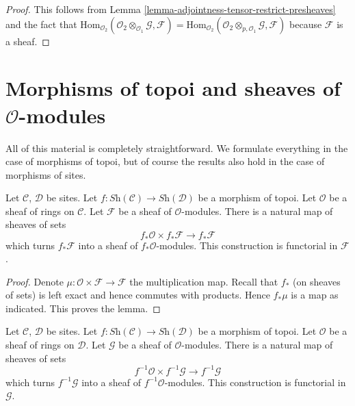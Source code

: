 \begin{proof}
This follows from
Lemma \ref{lemma-adjointness-tensor-restrict-presheaves}
and the fact that
$\text{Hom}_{\mathcal{O}_2}(
\mathcal{O}_2 \otimes_{\mathcal{O}_1} \mathcal{G},
\mathcal{F}
)
=
\text{Hom}_{\mathcal{O}_2}(
\mathcal{O}_2 \otimes_{p, \mathcal{O}_1} \mathcal{G},
\mathcal{F}
)$
because $\mathcal{F}$ is a sheaf.
\end{proof}




\section{Morphisms of topoi and sheaves of $\mathcal{O}$-modules}
\label{section-sheaves-modules-functorial} 

\noindent
All of this material is completely straightforward.
We formulate everything in the case of morphisms of topoi,
but of course the results also hold in the case of morphisms of sites.

\begin{lemma}
\label{lemma-pushforward-module}
Let $\mathcal{C}$, $\mathcal{D}$ be sites.
Let $f : \textit{Sh}(\mathcal{C}) \to \textit{Sh}(\mathcal{D})$
be a morphism of topoi.
Let $\mathcal{O}$ be a sheaf of rings on $\mathcal{C}$.
Let $\mathcal{F}$ be a sheaf of $\mathcal{O}$-modules.
There is a natural map of sheaves of sets
$$
f_*\mathcal{O} \times f_*\mathcal{F}
\longrightarrow
f_*\mathcal{F}
$$
which turns $f_*\mathcal{F}$ into a sheaf of $f_*\mathcal{O}$-modules.
This construction is functorial in $\mathcal{F}$.
\end{lemma}

\begin{proof}
Denote $\mu : \mathcal{O} \times \mathcal{F} \to \mathcal{F}$ the
multiplication map. Recall that $f_*$ (on sheaves of sets) is left exact
and hence commutes with products. Hence $f_*\mu$ is a map as
indicated. This proves the lemma.
\end{proof}

\begin{lemma}
\label{lemma-pullback-module}
Let $\mathcal{C}$, $\mathcal{D}$ be sites.
Let $f : \textit{Sh}(\mathcal{C}) \to \textit{Sh}(\mathcal{D})$
be a morphism of topoi.
Let $\mathcal{O}$ be a sheaf of rings on $\mathcal{D}$.
Let $\mathcal{G}$ be a sheaf of $\mathcal{O}$-modules.
There is a natural map of sheaves of sets
$$
f^{-1}\mathcal{O} \times f^{-1}\mathcal{G}
\longrightarrow
f^{-1}\mathcal{G}
$$
which turns $f^{-1}\mathcal{G}$ into a sheaf of $f^{-1}\mathcal{O}$-modules.
This construction is functorial in $\mathcal{G}$.
\end{lemma}

